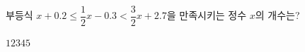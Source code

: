 부등식 $x+0.2\le\dfrac{1}{2}x-0.3<\dfrac{3}{2}x+2.7$을 만족시키는 정수 $x$의 개수는?
\begin{choices32}{$1$}{$2$}{$3$}{$4$}{$5$}\end{choices32}
